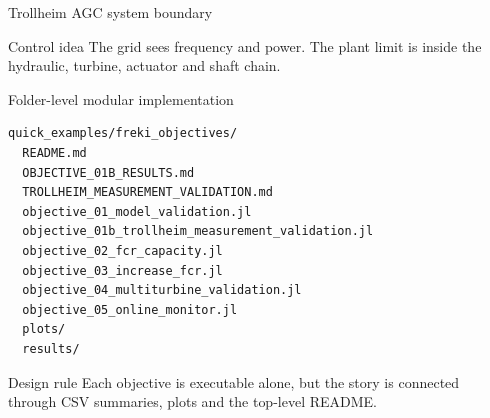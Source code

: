 \documentclass[aspectratio=169,11pt]{beamer}
\begin{document}
\begin{frame}{Trollheim AGC system boundary}
\centering
{}
\vspace{0.25cm}
\begin{block}{Control idea}
The grid sees frequency and power. The plant limit is inside the hydraulic, turbine, actuator and shaft chain.
\end{block}
\end{frame}

\begin{frame}[fragile]{Folder-level modular implementation}
\begin{lstlisting}[basicstyle=\ttfamily\tiny]
quick_examples/freki_objectives/
  README.md
  OBJECTIVE_01B_RESULTS.md
  TROLLHEIM_MEASUREMENT_VALIDATION.md
  objective_01_model_validation.jl
  objective_01b_trollheim_measurement_validation.jl
  objective_02_fcr_capacity.jl
  objective_03_increase_fcr.jl
  objective_04_multiturbine_validation.jl
  objective_05_online_monitor.jl
  plots/
  results/
\end{lstlisting}
\vspace{0.2cm}
\begin{block}{Design rule}
Each objective is executable alone, but the story is connected through CSV summaries, plots and the top-level README.
\end{block}
\end{frame}
\end{document}
